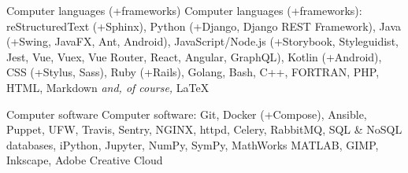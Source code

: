 
\resumeonesubsection
{Computer languages (+frameworks)}
{Computer languages (+frameworks):}
\sectiondescription
{
reStructuredText (+Sphinx),
Python (+Django, Django REST Framework),
Java (+Swing, JavaFX, Ant, Android),
JavaScript/Node.js (+Storybook, Styleguidist, Jest, Vue, Vuex, Vue Router, React, Angular, GraphQL),
Kotlin (+Android),
CSS (+Stylus, Sass),
Ruby (+Rails), Golang,
Bash, C++, FORTRAN,
PHP, HTML, Markdown
\textit{and, of course,} {\selectfont\LaTeX}
}

\resumeonesubsection
{Computer software}
{Computer software:}
\sectiondescription
{
Git,
Docker (+Compose),
Ansible, Puppet, UFW,
Travis, Sentry,
NGINX, httpd, Celery, RabbitMQ, SQL \& NoSQL databases,
iPython, Jupyter, NumPy, SymPy, MathWorks MATLAB,
GIMP, Inkscape, Adobe Creative Cloud
}
